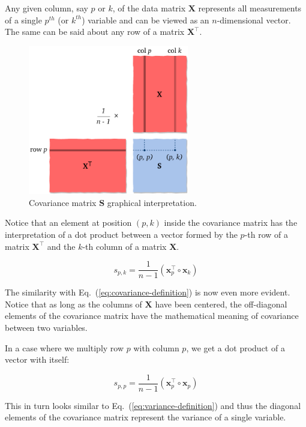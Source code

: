 \documentclass[10pt,twocolumn]{article}
\begin{document}
Any given column, say $p$ or $k$, of the data matrix $\mathbf{X}$ represents all measurements of a single $p^{th}$ (or $k^{th}$) variable and can be viewed as an $n$-dimensional vector. The same can be said about any row of a matrix $\mathbf{X}^{\top}$.

\begin{figure}[H]
\centering\includegraphics[width=7cm]{cov-matrix.pdf}
\caption{Covariance matrix $\mathbf{S}$ graphical interpretation.}
\label{fig:covariance-matrix}
\end{figure}

Notice that an element at position $(p,k)$ inside the covariance matrix has the interpretation of a dot product between a vector formed by the $p$-th row of a matrix $\mathbf{X}^{\top}$ and the $k$-th column of a matrix $\mathbf{X}$.

\begin{equation}
s_{p,k} = \frac{1}{n-1} (\mathbf{x}_p^{\top} \circ \mathbf{x}_k)
\end{equation}

The similarity with Eq.~(\ref{eq:covariance-definition}) is now even more evident. Notice that as long as the columns of $\mathbf{X}$ have been centered, the off-diagonal elements of the covariance matrix have the mathematical meaning of covariance between two variables.

In a case where we multiply row $p$ with column $p$, we get a dot product of a vector with itself:

\begin{equation}
s_{p,p} = \frac{1}{n-1} ( \mathbf{x}_p^{\top} \circ \mathbf{x}_p)
\end{equation}

This in turn looks similar to Eq.~(\ref{eq:variance-definition}) and thus the diagonal elements of the covariance matrix represent the variance of a single variable.
\end{document}
